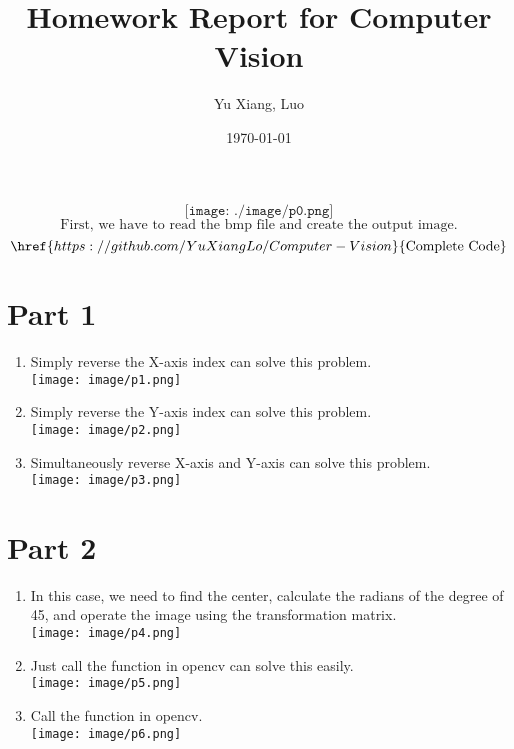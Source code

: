 \documentclass[12pt,a4paper]{article}
\title{Homework Report for Computer Vision}
\author{Yu Xiang, Luo}
\date{\today}
\begin{document}
\maketitle

\[
	\texttt{[image: ./image/p0.png]}
\]
\[
	\text{First, we have to read the bmp file and create the output image.}
\]
\[
	\href{https://github.com/YuXiangLo/Computer-Vision}{\text{Complete Code}}
\]
\section*{Part 1}
\begin{enumerate}[label=(\alph*)]
	\item Simply reverse the X-axis index can solve this problem.\\ 
		\texttt{[image: image/p1.png]}
	\item Simply reverse the Y-axis index can solve this problem.\\
		\texttt{[image: image/p2.png]}
	\item Simultaneously reverse X-axis and Y-axis can solve this problem.\\
		\texttt{[image: image/p3.png]}
\end{enumerate}

\section*{Part 2}
\begin{enumerate}[label=(\alph*), resume]
	\item In this case, we need to find the center, calculate the radians of the degree of 45, and operate the image using the transformation matrix.\\
	\texttt{[image: image/p4.png]}
	\item Just call the function in opencv can solve this easily.\\
		\texttt{[image: image/p5.png]}
	\item Call the function in opencv.\\
		\texttt{[image: image/p6.png]}
\end{enumerate}
\end{document}
